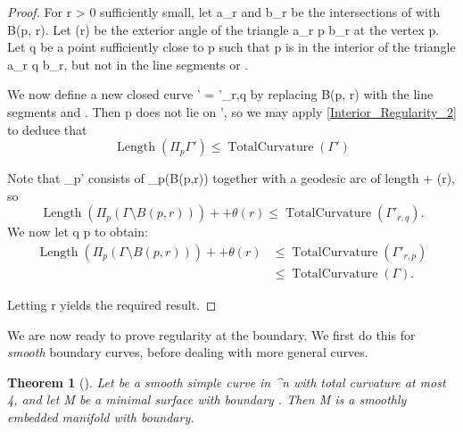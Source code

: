 \documentclass[a4paper, 11pt]{article}
\theoremstyle{plain}
\newtheorem{theorem}{Theorem}[section]
\theoremstyle{definition}
\theoremstyle{remark}
\numberwithin{equation}{subsection}
\def\({}
\def\){}
\def\pi{}
\begin{document}
\begin{proof}
For \(r > 0\) sufficiently small, let \(a_{r}\) and \(b_{r}\) be the intersections of \(\Gamma\) with \(\partial B(p, r)\). Let \(\theta (r)\) be the exterior angle of the triangle \(\triangle a_{r} p b_{r}\) at the vertex \(p\). Let \(q\) be a point sufficiently close to \(p\) such that \(p\) is in the interior of the triangle \(\triangle a_{r} q b_{r}\), but not in the line segments \(\) or \(\).

We now define a new closed curve \(\Gamma' = \Gamma'_{r,q}\) by replacing \(\Gamma \cap B(p, r)\) with the line segments \(\) and \(\). Then \(p\) does not lie on \(\Gamma'\), so we may apply \cref{Interior_Regularity_2} to deduce that
\begin{equation}
\operatorname{Length}(\Pi_{p}\Gamma') \leqslant \operatorname{TotalCurvature}(\Gamma')
\end{equation}

Note that \(\Pi_{p}\Gamma'\) consists of \(\Pi_{p}(\Gamma \setminus B(p,r))\) together with a geodesic arc of length \(\pi + \theta(r)\), so
\begin{equation}
\operatorname{Length}(\Pi_{p}(\Gamma \setminus B(p,r))) + \pi + \theta(r) \leqslant \operatorname{TotalCurvature}(\Gamma'_{r,q}).
\end{equation}
We now let \(q \rightarrow p\) to obtain:
\begin{align}
\operatorname{Length}(\Pi_{p}(\Gamma \setminus B(p,r))) + \pi + \theta(r) &\leqslant \operatorname{TotalCurvature}(\Gamma'_{r,p}) \\ &\leqslant \operatorname{TotalCurvature}(\Gamma).
\end{align}

Letting \(r \) yields the required result.
\end{proof}

We are now ready to prove regularity at the boundary. We first do this for \emph{smooth} boundary curves, before dealing with more general curves.

\begin{theorem}[{\cite[Theorem 3.2]{EWW02}}]
Let \(\Gamma\) be a smooth simple curve in \(^{n}\) with total curvature at most \(4\pi\), and let \(M\) be a minimal surface with boundary \(\Gamma\). Then \(M\) is a smoothly embedded manifold with boundary.
\end{theorem}
\end{document}
